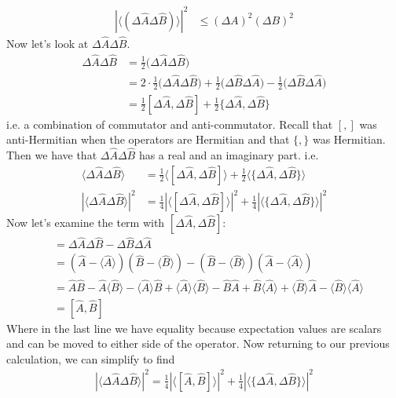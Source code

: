 \documentclass[a4paper, 11pt]{article}
\newcommand{\expect}[1]{\langle #1 \rangle}
\begin{document}
		\begin{align}
			|\expect{(\Delta\hat{A}\Delta\hat{B})}|^2 &\leq (\Delta A)^2(\Delta B)^2
		\end{align}
	Now let's look at $\Delta\hat{A}\Delta\hat{B}$. 
		\begin{align*}
			\Delta\hat{A}\Delta\hat{B} &= \frac{1}{2}\Big(\Delta\hat{A}\Delta\hat{B}\Big) \\
				&= 2\cdot\frac{1}{2}\Big(\Delta\hat{A}\Delta\hat{B}\Big)+\frac{1}{2}\Big(\Delta\hat{B}\Delta\hat{A}\Big)-\frac{1}{2}\Big(\Delta\hat{B}\Delta\hat{A}\Big) \\
				&= \frac{1}{2}[\Delta\hat{A}, \Delta\hat{B}] + \frac{1}{2}\{\Delta\hat{A}, \Delta\hat{B}\}
		\end{align*}
	i.e. a combination of commutator and anti-commutator. Recall that $[ , ]$ was anti-Hermitian when the operators are Hermitian and that $\{ , \}$ was Hermitian. Then we have that $\Delta\hat{A}\Delta\hat{B}$ has a real and an imaginary part. i.e. 
		\begin{align*}
			\expect{\Delta\hat{A}\Delta\hat{B}} &= \frac{1}{2}\expect{[\Delta\hat{A}, \Delta\hat{B}]} + \frac{1}{2}\expect{\{ \Delta\hat{A},\Delta\hat{B}   \}} \\
			|\expect{\Delta\hat{A}\Delta\hat{B}}|^2 &= \frac{1}{4}|\expect{[\Delta\hat{A}, \Delta\hat{B}]}|^2 + \frac{1}{4}|\expect{\{ \Delta\hat{A},\Delta\hat{B}   \}}|^2 
		\end{align*}
	Now let's examine the term with $[\Delta \hat{A}, \Delta \hat{B}]$: 
		\begin{align*}
			[\Delta \hat{A}, \Delta \hat{B}] &= \Delta\hat{A}\Delta\hat{B}-\Delta\hat{B}\Delta\hat{A} \\ 
				&= (\hat{A}-\expect{\hat{A}})(\hat{B}-\expect{\hat{B}})-(\hat{B}-\expect{\hat{B}})(\hat{A}-\expect{\hat{A}}) \\ 
				&= \hat{A}\hat{B}-\hat{A}\expect{\hat{B}}-\expect{\hat{A}}\hat{B} + \expect{\hat{A}}\expect{\hat{B}}- \hat{B}\hat{A}+\hat{B}\expect{\hat{A}}+\expect{\hat{B}}\hat{A}-\expect{\hat{B}}\expect{\hat{A}} \\ 
				&= [\hat{A}, \hat{B}]
		\end{align*}
	Where in the last line we have equality because expectation values are scalars and can be moved to either side of the operator. Now returning to our previous calculation, we can simplify to find
		\begin{align*}
			|\expect{\Delta\hat{A}\Delta\hat{B}}|^2 = \frac{1}{4}|\expect{[\hat{A}, \hat{B}]}|^2 + \frac{1}{4}|\expect{\{ \Delta\hat{A}, \Delta\hat{B}  \}}|^2 \\ 
		\end{align*}
\end{document}

